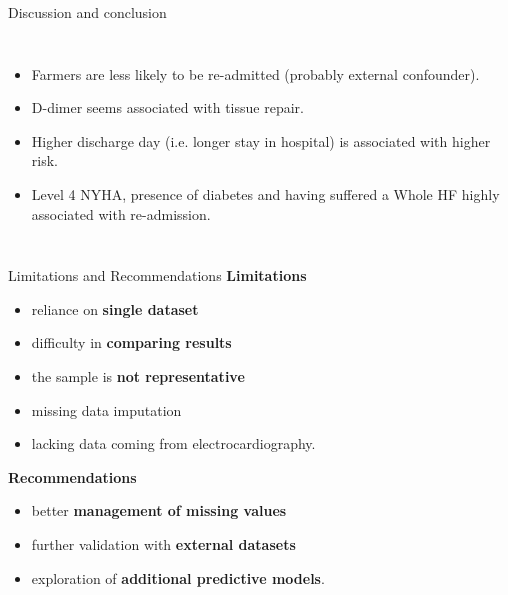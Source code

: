 \documentclass[aspectratio=169,xcolor=dvipsnames]{beamer}
\begin{document}
\begin{frame}{Discussion and conclusion}
\begin{columns}[c]
        \centering
        \begin{itemize}
            \item Farmers are less likely to be re-admitted (probably external confounder).
            \item D-dimer seems associated with tissue repair.
            \item Higher discharge day (i.e. longer stay in hospital) is associated with higher risk.
            \item Level 4 NYHA, presence of diabetes and having suffered a Whole HF highly associated with re-admission.
        \end{itemize}
    \end{columns}
    
\end{frame}





\begin{frame}{Limitations and Recommendations}
\textbf{Limitations}
\begin{itemize}
  \item reliance on \textbf{single dataset}
  \item difficulty in \textbf{comparing results}
  \item the sample is \textbf{not representative}
  \item missing data imputation
  \item lacking data coming from electrocardiography.
\end{itemize}

\textbf{Recommendations}
\begin{itemize}
  \item better \textbf{management of missing values}
  \item further validation with \textbf{external datasets}
  \item exploration of \textbf{additional predictive models}.
\end{itemize}
\end{frame}
\end{document}
